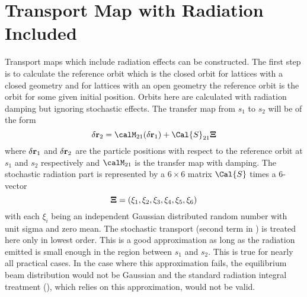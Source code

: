 \section{Transport Map with Radiation Included}
\label{s:map.rad}

Transport maps which include radiation effects can be constructed\cite{b:ohmi}. The first step is to
calculate the reference orbit which is the closed orbit for lattices with a closed geometry and for
lattices with an open geometry the reference orbit is the orbit for some given initial
position. Orbits here are calculated with radiation damping but ignoring stochastic effects. The
transfer map from $s_1$ to $s_2$ will be of the form
\begin{equation}
  \delta\bfr_2 = \calM_{21}(\delta\bfr_1) + \Cal{S}_{21} \Bf\Xi
  \label{rmrsx}
\end{equation}
where $\delta{\bf r}_1$ and $\delta{\bf r}_2$ are the particle positions with respect to the reference
orbit at $s_1$ and $s_2$ respectively and $\calM_{21}$ is the transfer map with damping. The
stochastic radiation part is represented by a $6\times6$ matrix $\Cal{S}$ times a $6$-vector
\begin{equation}
  {\bf \Xi} = (\xi_1, \xi_2, \xi_3, \xi_4, \xi_5, \xi_6)
\end{equation}
with each $\xi_i$ being an independent Gaussian distributed random number with unit sigma and zero
mean. The stochastic transport (second term in ) is treated here only in lowest
order. This is a good approximation as long as the radiation emitted is small enough in the region
between $s_1$ and $s_2$. This is true for nearly all practical cases. In the case where this
approximation fails, the equilibrium beam distribution would not be Gaussian and the standard
radiation integral treatment (), which relies on this approximation, would not be
valid.

